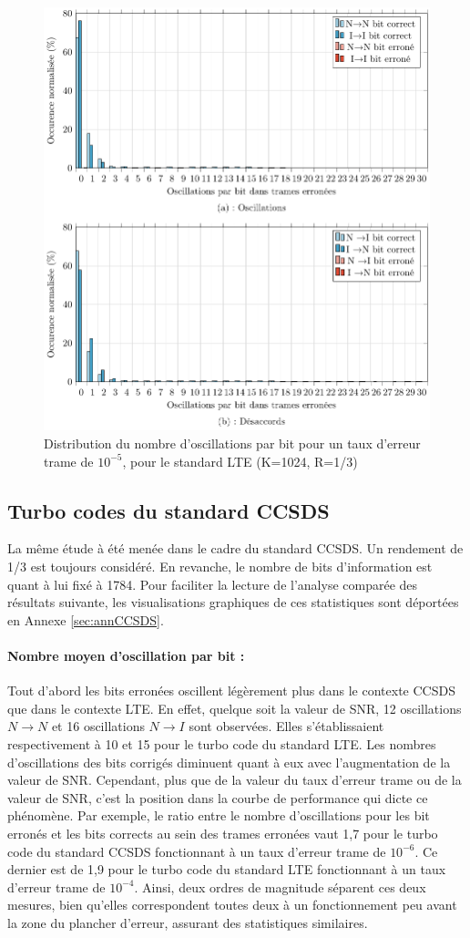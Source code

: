 \begin{figure}[!t]
	\centering
	\includegraphics[width=.8\textwidth]{main/ch2_fig/tikz/d_lte_10-5.pdf}
	\caption{Distribution du nombre d'oscillations par bit pour un taux d'erreur trame de $10^{-5}$, pour le standard LTE (K=1024, R=1/3) \label{fig:d_lte_10-5}}
\end{figure}

\subsection{Turbo codes du standard CCSDS}
La même étude à été menée dans le cadre du standard CCSDS. Un rendement de 1/3 est toujours considéré. En revanche, le nombre 
de bits d'information est quant à lui fixé à 1784. Pour faciliter la lecture de l'analyse comparée des résultats suivante, 
les visualisations graphiques de ces statistiques sont déportées en Annexe \ref{sec:annCCSDS}.
\paragraph*{Nombre moyen d'oscillation par bit : } 
Tout d'abord les bits erronées oscillent légèrement plus dans le contexte CCSDS que dans le contexte LTE. En effet, 
quelque soit la valeur de SNR, 12 oscillations $N\rightarrow N$ et 16 oscillations $N\rightarrow I$ sont observées. Elles 
s'établissaient respectivement à 10 et 15 pour le turbo code du standard LTE. Les nombres d'oscillations des bits corrigés diminuent quant à eux
avec l’augmentation de la valeur de SNR. Cependant, plus que de la valeur du taux d'erreur trame ou de la valeur de SNR,
c'est la position dans la courbe de performance qui dicte ce phénomène. Par exemple, le ratio entre le nombre 
d'oscillations pour les bit erronés et les bits corrects au sein des trames erronées vaut 1,7 pour le turbo code du 
standard CCSDS fonctionnant à un taux d'erreur trame de $10^{-6}$. Ce dernier est de 1,9 pour le turbo code du 
standard LTE fonctionnant à un taux d'erreur trame de $10^{-4}$. Ainsi, deux ordres de magnitude séparent ces deux mesures,
bien qu'elles correspondent toutes deux à un fonctionnement peu avant la zone du plancher d'erreur, assurant des statistiques similaires.
